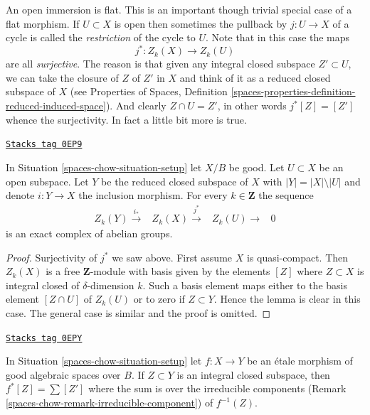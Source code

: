 An open immersion is flat. This is an important though trivial special
case of a flat morphism. If $U \subset X$ is open then sometimes the
pullback by $j : U \to X$ of a cycle is called the {\it restriction} of the
cycle to $U$. Note that in this case the maps
$$
j^* : Z_k(X) \longrightarrow Z_k(U)
$$
are all {\it surjective}. The reason is that given any integral closed
subspace $Z' \subset U$, we can take the closure of $Z$ of $Z'$ in $X$
and think of it as a reduced closed subspace of $X$ (see
Properties of Spaces, Definition
\ref{spaces-properties-definition-reduced-induced-space}).
And clearly $Z \cap U = Z'$, in other words
$j^*[Z] = [Z']$ whence the surjectivity. In fact a little bit more
is true.

\begin{lemma}
\label{spaces-chow-lemma-exact-sequence-open}
\href{https://stacks.math.columbia.edu/tag/0EP9}{\texttt{Stacks tag 0EP9}}

In Situation \ref{spaces-chow-situation-setup} let $X/B$ be good.
Let $U \subset X$ be an open subspace. Let $Y$ be the
reduced closed subspace of $X$ with $|Y| = |X| \setminus |U|$
and denote $i : Y \to X$ the inclusion morphism.
For every $k \in \mathbf{Z}$ the sequence
$$
\begin{array}{cccc}Z_k(Y) \overset{i_*}{\longrightarrow} & Z_k(X) \overset{j^*}{\longrightarrow} & Z_k(U) \longrightarrow & 0\end{array}
$$
is an exact complex of abelian groups.
\end{lemma}

\begin{proof}
Surjectivity of $j^*$ we saw above.
First assume $X$ is quasi-compact. Then $Z_k(X)$ is a free $\mathbf{Z}$-module
with basis given by the elements $[Z]$ where $Z \subset X$ is integral
closed of $\delta$-dimension $k$. Such a basis element maps
either to the basis element $[Z \cap U]$ of $Z_k(U)$
or to zero if $Z \subset Y$.
Hence the lemma is clear in this case. The general case is similar
and the proof is omitted.
\end{proof}

\begin{lemma}
\label{spaces-chow-lemma-etale-pullback}
\href{https://stacks.math.columbia.edu/tag/0EPY}{\texttt{Stacks tag 0EPY}}

In Situation \ref{spaces-chow-situation-setup} let $f : X \to Y$ be an \'etale
morphism of good algebraic spaces over $B$. If $Z \subset Y$ is an integral
closed subspace, then $f^*[Z] = \sum [Z']$ where the sum is over the
irreducible components (Remark \ref{spaces-chow-remark-irreducible-component})
of $f^{-1}(Z)$.
\end{lemma}

